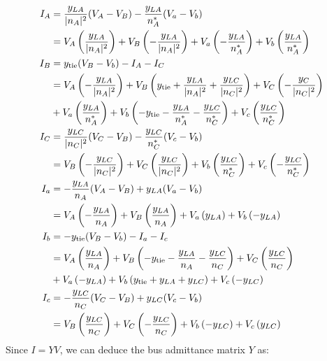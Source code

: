 \documentclass[10pt]{article}
\begin{document}
\begin{align}
	I_A &= \frac{y_{LA}}{|n_A|^2}(V_A - V_B) - \frac{y_{LA}}{n_A^*}(V_a - V_b) \notag \\
	&= V_A\left(\frac{y_{LA}}{|n_A|^2}\right) + V_B\left(-\frac{y_{LA}}{|n_A|^2}\right) + V_a\left(-\frac{y_{LA}}{n_A^*}\right) + V_b\left(\frac{y_{LA}}{n_A^*}\right) \notag \\
	I_B &= y_\text{tie}(V_B - V_b) - I_A - I_C \notag \\
	&= V_A\left(-\frac{y_{LA}}{|n_A|^2}\right) + V_B \left(y_\text{tie} + \frac{y_{LA}}{|n_A|^2} + \frac{y_{LC}}{|n_C|^2}\right) + V_C\left(-\frac{y_{C}}{|n_C|^2}\right) \notag \\
	&+ V_a\left(\frac{y_{LA}}{n_A^*}\right) + V_b\left(-y_\text{tie} -\frac{y_{LA}}{n_A^*} - \frac{y_{LC}}{n_C^*}\right) + V_c\left(\frac{y_{LC}}{n_C^*}\right) \notag \\
	I_C &= \frac{y_{LC}}{|n_C|^2}(V_C - V_B) - \frac{y_{LC}}{n_C^*}(V_c - V_b) \notag \\
	&= V_B\left(-\frac{y_{LC}}{|n_C|^2}\right) + V_C\left(\frac{y_{LC}}{|n_C|^2}\right) + V_b\left(\frac{y_{LC}}{n_C^*}\right) +  V_c\left(-\frac{y_{LC}}{n_C^*}\right) \notag \\
	I_a &= -\frac{y_{LA}}{n_A}(V_A - V_B) + y_{LA}(V_a - V_b) \notag \\
	&= V_A\left(-\frac{y_{LA}}{n_A}\right) + V_B\left(\frac{y_{LA}}{n_A}\right) + V_a\left(y_{LA}\right) + V_b\left(-y_{LA}\right)\notag \\
	I_b &= -y_\text{tie}(V_B - V_b) - I_a - I_c \notag \\
	&= V_A\left( \frac{y_{LA}}{n_A}\right) + V_B\left(-y_\text{tie} - \frac{y_{LA}}{n_A} - \frac{y_{LC}}{n_C}\right) + V_C\left( \frac{y_{LC}}{n_C}\right) \notag \\
	&+ V_a\left(-y_{LA}\right) + V_b\left(y_\text{tie} + y_{LA} + y_{LC}\right) + V_c\left(-y_{LC}\right) \notag \\
	I_c &= -\frac{y_{LC}}{n_C}(V_C - V_B) + y_{LC}(V_c - V_b) \notag \\
	&= V_B\left(\frac{y_{LC}}{n_C}\right) + V_C\left( -\frac{y_{LC}}{n_C}\right) + V_b\left(-y_{LC}\right)  + V_c\left(y_{LC}\right)
\end{align}
Since $I = YV$, we can deduce the bus admittance matrix $Y$ as:
\end{document}

